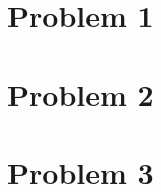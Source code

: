 \documentclass[titlepage]{report}
\begin{document}
\section{Problem 1}
\begin{figure}
	\centering
	
	\caption{}
	\label{fig:MDSLP1}
\end{figure}

\section{Problem 2}
\begin{figure}
	\centering
	
	\caption{}
	\label{fig:MDSLP2}
\end{figure}

\section{Problem 3}
\begin{figure}
	\centering
	
	\caption{}
	\label{fig:MDSLP3N4}
\end{figure}

\begin{figure}
	\centering
	
	\caption{}
	\label{fig:MDSLP3N5}
\end{figure}

\begin{figure}
	\centering
	
	\caption{}
	\label{fig:MDSLP3N6}
\end{figure}

\insertbibliography
%
%
\end{document}
